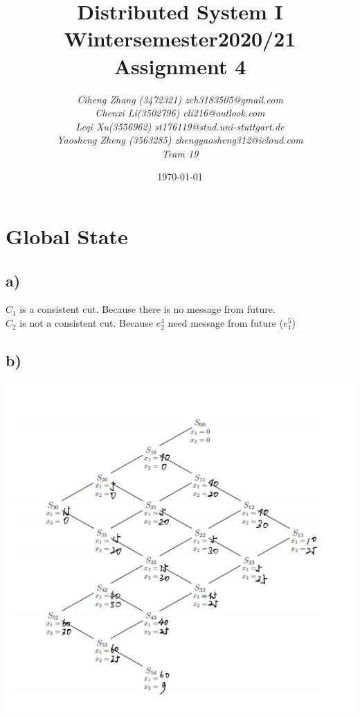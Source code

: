 \documentclass{article}
\begin{document}
\begin{titlepage}
    \title{\Huge \textbf{Distributed System I\\Wintersemester2020/21\\Assignment 4} }
    \author{\LARGE \textsl{Ciheng Zhang (3472321) zch3183505@gmail.com}\\\LARGE \textsl{Chenxi Li(3502796) cli216@outlook.com }\\\LARGE \textsl{Leqi Xu(3556962) st176119@stud.uni-stuttgart.de} \\\LARGE \textsl{Yaosheng Zheng (3563285) zhengyaosheng312@icloud.com}\\\LARGE \textsl{Team 19 } \\[200pt]}
    \date{\today}
    \maketitle
    \thispagestyle{empty}
\end{titlepage}
\newpage
\section{Global State}
\subsection*{a)}
$C_1$ is a consistent cut. Because there is no message from future.
\\$C_2$ is not a consistent cut. Because $e_2^4$ need message from future ($e_1^5$)
\subsection*{b)}
\includegraphics{1_b.png}
\end{document}

